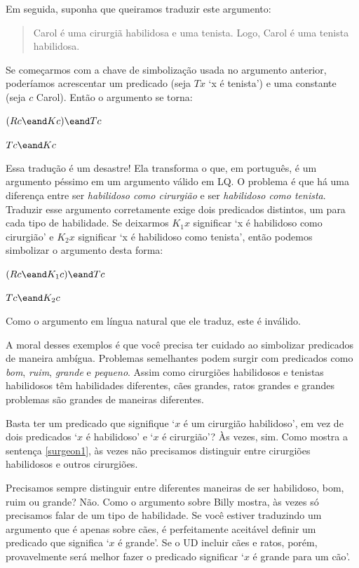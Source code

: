 Em seguida, suponha que queiramos traduzir este argumento:
\begin{quote}
\label{surgeon3}
Carol é uma cirurgiã habilidosa e uma tenista. Logo, Carol é uma tenista habilidosa.
\end{quote}
Se começarmos com a chave de simbolização usada no argumento anterior, poderíamos acrescentar um predicado (seja $Tx$ `x é tenista') e uma constante (seja $c$ Carol). Então o argumento se torna:
\begin{earg}
\item[] $(Rc \eand Kc) \eand Tc$
\item[\therefore] $Tc \eand Kc$
\end{earg}
Essa tradução é um desastre! Ela transforma o que, em português, é um argumento péssimo em um argumento válido em LQ. O problema é que há uma diferença entre ser \emph{habilidoso como cirurgião} e ser \emph{habilidoso como tenista}. Traduzir esse argumento corretamente exige dois predicados distintos, um para cada tipo de habilidade. Se deixarmos $K_1x$ significar `x é habilidoso como cirurgião' e $K_2x$ significar `x é habilidoso como tenista', então podemos simbolizar o argumento desta forma:
\begin{earg}
\label{surgeon3correct}
\item[] $(Rc \eand K_1c) \eand Tc$
\item[\therefore] $Tc \eand K_2c$
\end{earg}
Como o argumento em língua natural que ele traduz, este é inválido.

A moral desses exemplos é que você precisa ter cuidado ao simbolizar predicados de maneira ambígua. Problemas semelhantes podem surgir com predicados como \emph{bom}, \emph{ruim}, \emph{grande} e \emph{pequeno}. Assim como cirurgiões habilidosos e tenistas habilidosos têm habilidades diferentes, cães grandes, ratos grandes e grandes problemas são grandes de maneiras diferentes.

Basta ter um predicado que signifique `$x$ é um cirurgião habilidoso', em vez de dois predicados `$x$ é habilidoso' e `$x$ é cirurgião'? Às vezes, sim. Como mostra a sentença \ref{surgeon1}, às vezes não precisamos distinguir entre cirurgiões habilidosos e outros cirurgiões.

Precisamos sempre distinguir entre diferentes maneiras de ser habilidoso, bom, ruim ou grande? Não. Como o argumento sobre Billy mostra, às vezes só precisamos falar de um tipo de habilidade. Se você estiver traduzindo um argumento que é apenas sobre cães, é perfeitamente aceitável definir um predicado que significa `$x$ é grande'. Se o UD incluir cães e ratos, porém, provavelmente será melhor fazer o predicado significar `$x$ é grande para um cão'.


